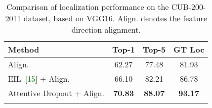 \begin{table}[t]
  \centering
    \begin{tabular}{lccc}
    \Xhline{1pt}
    Method & Top-1  & Top-5 & GT Loc \\
    \hline
    \hline
    Align. & 62.27 & 77.48 & 81.93 \\
    EIL~[\textcolor{green}{15}] + Align. & 66.10 & 82.21 & 86.78 \\
    Attentive Dropout + Align. & \textbf{70.83} & \textbf{88.07} & \textbf{93.17} \\
    \Xhline{1pt}
    \end{tabular}%
    \vspace{-0.7em}
     \caption{Comparison of localization performance on the CUB-200-2011 dataset, based on VGG16. Align. denotes the feature direction alignment.}
  \label{tab:compare_eil}%
\end{table}%